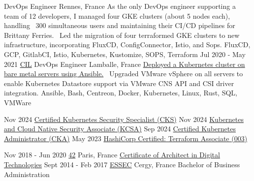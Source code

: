 \documentclass[10pt]{developercv}
\begin{document}
\begin{entrylist}
		{DevOps Engineer}
		{Rennes, France}
		{As the only DevOps engineer supporting a team of 12 developers, I managed four GKE clusters (about 5 nodes each), handling ~300 simultaneous users and maintaining their CI/CD pipelines for Brittany Ferries. \ 
		Led the migration of four terraformed GKE clusters to new infrastructure, incorporating FluxCD, ConfigConnector, Istio, and Sops.
		}
		{FluxCD, GCP, GitlabCI, Istio, Kubernetes, Kustomize, SOPS, Terraform}
	\entry
		{Jul 2020 - May 2021}
		{\href{https://www.cil-lamballe.com/}{CIL}}
		{DevOps Engineer}
		{Lamballe, France}
		{\href{https://github.com/Ant0wan/VMWare-Kubenetes-cluster}{Deployed a Kubernetes cluster on bare metal servers using Ansible.} \ 
		Upgraded VMware vSphere on all servers to enable Kubernetes Datastore support via VMware CNS API and CSI driver integration.
		}
		{Ansible, Bash, Centreon, Docker, Kubernetes, Linux, Rust, SQL, VMWare}
\end{entrylist}


\begin{entrylist}
	\certentry
		{Nov 2024}
		{\href{}
		{Certified Kubernetes Security Specialist (CKS)}}
	\certentry
		{Nov 2024}
		{\href{https://ti-user-certificates.s3.amazonaws.com/e0df7fbf-a057-42af-8a1f-590912be5460/e8d771bd-68bf-4ac7-8077-2e885178505a-antoine-barthelemy-0dc67065-e867-412f-9d0e-1c246b44b258-certificate.pdf}
		{Kubernetes and Cloud Native Security Associate (KCSA)}}
	\certentry
		{Sep 2024}
		{\href{https://ti-user-certificates.s3.amazonaws.com/e0df7fbf-a057-42af-8a1f-590912be5460/e8d771bd-68bf-4ac7-8077-2e885178505a-antoine-barthelemy-21f9eeb4-ead2-4311-ba93-15865ca88f93-certificate.pdf}
		{Certified Kubernetes Administrator (CKA)}}
	\certentry
		{May 2023}
		{\href{https://www.credly.com/badges/7b8f2540-6b35-43a7-84d6-24dceb4001ee/public_url}
		{HashiCorp Certified: Terraform Associate (003)}}

\end{entrylist}


\begin{entrylist}
	\eduentry
		{Nov 2018 - Jun 2020}
		{\href{https://42.fr/}{42}}
		{Paris, France}
		{\href{https://acclaim-production-app.files.credly.com/uploads/printable_pdf/printable_pdf/c858004e-df38-4309-b3c4-e814299c3c6e/42-Certificatepdf20241002-7-ngaeg7.pdf?response-content-disposition=attachment&X-Amz-Expires=604800&X-Amz-Date=20241002T173738Z&X-Amz-Algorithm=AWS4-HMAC-SHA256&X-Amz-Credential=AKIA5DGBWDLSBJ5BZX5Z\%2F20241002\%2Fus-east-1\%2Fs3\%2Faws4_request&X-Amz-SignedHeaders=host&X-Amz-Signature=a55bc0206580e9d1da963475100f2dcea13c7d6e9b855c452bca2ac1ecec216c}
		{Certificate of Architect in Digital Technologies}}
	\eduentry
		{Sept 2014 - Feb 2017}
		{\href{https://www.essec.edu}{ESSEC}}
		{Cergy, France}
		{Bachelor of Business Administration}
\end{entrylist}
\end{document}
